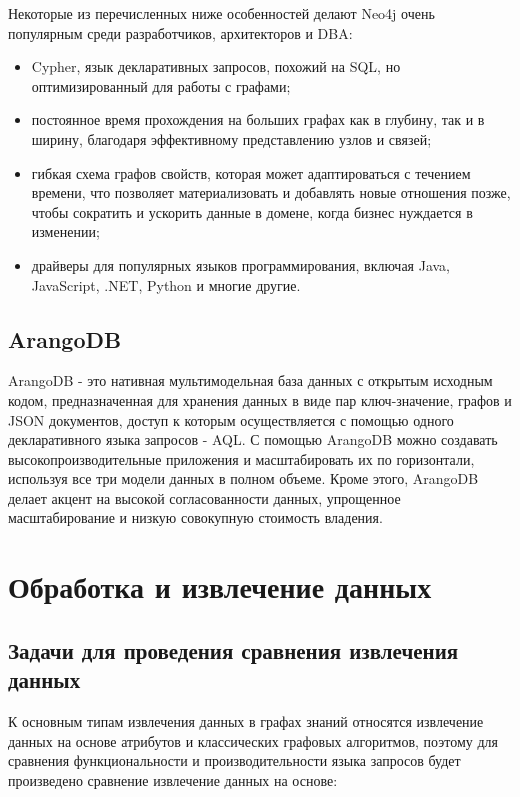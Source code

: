 Некоторые из перечисленных ниже особенностей делают Neo4j очень популярным среди разработчиков, архитекторов и DBA:

\begin{itemize}
    \item Cypher, язык декларативных запросов, похожий на SQL, но оптимизированный для работы с графами;
    \item постоянное время прохождения на больших графах как в глубину, так и в ширину, благодаря эффективному представлению узлов и связей;
    \item гибкая схема графов свойств, которая может адаптироваться с течением времени, что позволяет материализовать и добавлять новые отношения позже, чтобы сократить и ускорить данные в домене, когда бизнес нуждается в изменении;
    \item драйверы для популярных языков программирования, включая Java, JavaScript, .NET, Python и многие другие.
\end{itemize}

\subsection{ArangoDB}

ArangoDB - это нативная мультимодельная база данных с открытым исходным кодом, предназначенная для хранения данных в виде пар ключ-значение,
графов и JSON документов, доступ к которым осуществляется с помощью одного декларативного языка запросов - AQL. С помощью ArangoDB можно
создавать высокопроизводительные приложения и масштабировать их по горизонтали, используя все три модели данных в полном объеме.
Кроме этого, ArangoDB делает акцент на высокой согласованности данных, упрощенное масштабирование и низкую совокупную стоимость владения.


\section{Обработка и извлечение данных}

\subsection{Задачи для проведения сравнения извлечения данных}

К основным типам извлечения данных в графах знаний относятся извлечение данных на основе атрибутов и классических графовых алгоритмов,
поэтому для сравнения функциональности и производительности языка запросов будет произведено сравнение извлечение данных на основе:

